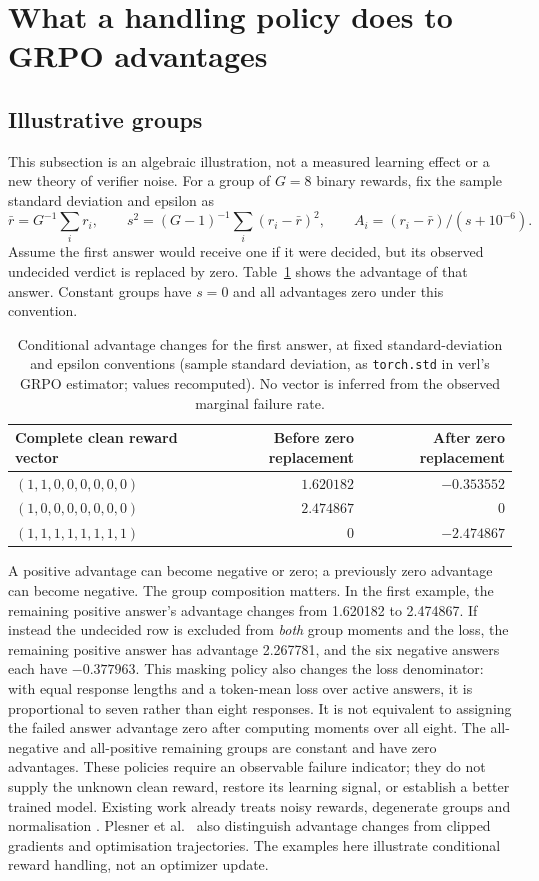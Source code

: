 \documentclass[10pt,a4paper]{article}
\let\cite\citep
\begin{document}
\section{What a handling policy does to GRPO advantages}
\label{sec:update}
\subsection{Illustrative groups}
This subsection is an algebraic illustration, not a measured learning effect
or a new theory of verifier noise. For a group of $G=8$ binary rewards,
fix the sample standard deviation and epsilon as
\[
 \bar r=G^{-1}\sum_i r_i,\qquad
 s^2=(G-1)^{-1}\sum_i(r_i-\bar r)^2,\qquad
 A_i=(r_i-\bar r)/(s+10^{-6}).
\]
Assume the first answer would receive one if it were decided, but its
observed undecided verdict is replaced by zero. Table~\ref{tab:advantages}
shows the advantage of that answer. Constant groups have $s=0$ and all
advantages zero under this convention.

\begin{table}[h]
\centering\small
\begin{tabular}{@{}lrr@{}}
\toprule
Complete clean reward vector & Before zero replacement & After zero replacement \\
\midrule
$(1,1,0,0,0,0,0,0)$ & $1.620182$ & $-0.353552$ \\
$(1,0,0,0,0,0,0,0)$ & $2.474867$ & $0$ \\
$(1,1,1,1,1,1,1,1)$ & $0$ & $-2.474867$ \\
\bottomrule
\end{tabular}
\caption{Conditional advantage changes for the first answer, at fixed
standard-deviation and epsilon conventions (sample standard deviation, as
\texttt{torch.std} in verl's GRPO estimator; values recomputed). No vector is inferred from the observed marginal failure
rate.}
\label{tab:advantages}
\end{table}

A positive advantage can become negative or zero; a previously zero
advantage can become negative. The group composition matters. In the first
example, the remaining positive answer's advantage changes from 1.620182
to 2.474867. If instead the undecided row is excluded from \emph{both}
group moments and the loss, the remaining positive answer has advantage
2.267781, and the six negative answers each have $-0.377963$.
This masking policy also changes the loss denominator: with equal response
lengths and a token-mean loss over active answers, it is proportional to
seven rather than eight responses. It is not equivalent to assigning the
failed answer advantage zero after computing moments over all eight.
The all-negative and all-positive remaining groups are constant and have
zero advantages. These policies require an observable failure indicator;
they do not supply the unknown clean reward, restore its learning signal,
or establish a better trained model. Existing work already treats noisy
rewards, degenerate groups and normalisation
\cite{cai2025noisy,nie2026starvation,yang2026biased}.
Plesner et al.\ \cite{plesner2026imperfect} also distinguish advantage
changes from clipped gradients and optimisation trajectories. The examples
here illustrate conditional reward handling, not an optimizer update.
\end{document}

